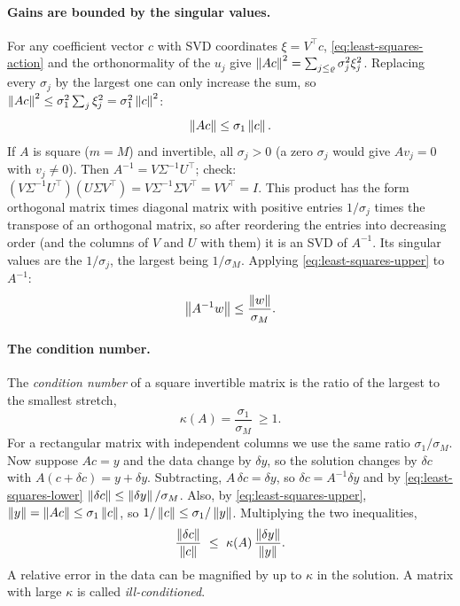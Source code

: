 \paragraph{Gains are bounded by the singular values.} For any coefficient vector $c$ with SVD coordinates $\xi = V^\top c$, \cref{eq:least-squares-action} and the orthonormality of the $u_j$ give $\left\lVert Ac\right\rVert^2 = \sum_{j\le\varrho}\sigma_j^2\xi_j^2$. Replacing every $\sigma_j$ by the largest one can only increase the sum, so $\left\lVert Ac\right\rVert^2\le\sigma_1^2\sum_j\xi_j^2 = \sigma_1^2\left\lVert c\right\rVert^2$:
\begin{equation}
\left\lVert Ac\right\rVert\le\sigma_1\left\lVert c\right\rVert.
\label{eq:least-squares-upper}
\end{equation}
If $A$ is square ($m = M$) and invertible, all $\sigma_j>0$ (a zero $\sigma_j$ would give $Av_j = 0$ with $v_j\neq0$). Then $A^{-1} = V\Sigma^{-1}U^\top$; check: $(V\Sigma^{-1}U^\top)(U\Sigma V^\top) = V\Sigma^{-1}\Sigma V^\top = VV^\top = I$. This product has the form orthogonal matrix times diagonal matrix with positive entries $1/\sigma_j$ times the transpose of an orthogonal matrix, so after reordering the entries into decreasing order (and the columns of $V$ and $U$ with them) it is an SVD of $A^{-1}$. Its singular values are the $1/\sigma_j$, the largest being $1/\sigma_M$. Applying \cref{eq:least-squares-upper} to $A^{-1}$:
\begin{equation}
\left\lVert A^{-1}w\right\rVert\le\frac{\left\lVert w\right\rVert}{\sigma_M}.
\label{eq:least-squares-lower}
\end{equation}

\paragraph{The condition number.} The \emph{condition number} of a square invertible matrix is the ratio of the largest to the smallest stretch,
\begin{equation}
\kappa(A) = \frac{\sigma_1}{\sigma_M}\ \ge 1 .
\label{eq:least-squares-kappa}
\end{equation}
For a rectangular matrix with independent columns we use the same ratio $\sigma_1/\sigma_M$. Now suppose $Ac = y$ and the data change by $\delta y$, so the solution changes by $\delta c$ with $A(c+\delta c) = y + \delta y$. Subtracting, $A\,\delta c = \delta y$, so $\delta c = A^{-1}\delta y$ and by \cref{eq:least-squares-lower} $\left\lVert \delta c\right\rVert\le\left\lVert \delta y\right\rVert/\sigma_M$. Also, by \cref{eq:least-squares-upper}, $\left\lVert y\right\rVert = \left\lVert Ac\right\rVert\le\sigma_1\left\lVert c\right\rVert$, so $1/\left\lVert c\right\rVert\le\sigma_1/\left\lVert y\right\rVert$. Multiplying the two inequalities,
\begin{equation}
\frac{\left\lVert \delta c\right\rVert}{\left\lVert c\right\rVert}\ \le\ \kappa(A)\,\frac{\left\lVert \delta y\right\rVert}{\left\lVert y\right\rVert} .
\label{eq:least-squares-cond-bound}
\end{equation}
A relative error in the data can be magnified by up to $\kappa$ in the solution. A matrix with large $\kappa$ is called \emph{ill-conditioned}.

